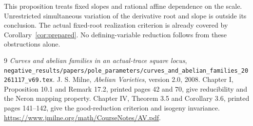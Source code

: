 \documentclass[11pt,a4paper]{article}
\begin{document}
This proposition treats fixed slopes and rational affine dependence
on the scale. Unrestricted simultaneous variation of the derivative
root and slope is outside its conclusion. The actual fixed-root
realization criterion is already covered by
Corollary~\ref{cor:prepared}. No defining-variable reduction follows
from these obstructions alone.

\begin{thebibliography}{9}
\emph{Curves and abelian families in an actual-trace square locus},
\nolinkurl{negative_results/papers/pole_parameters/curves_and_abelian_families_20261117_v69.tex}.
 J. S. Milne, \emph{Abelian Varieties}, version 2.0,
2008. Chapter I, Proposition 10.1 and Remark 17.2, printed
pages 42 and 70, give reducibility and the Neron mapping property.
Chapter IV, Theorem 3.5 and Corollary 3.6, printed
pages 141--142, give the good-reduction criterion and isogeny invariance.
\url{https://www.jmilne.org/math/CourseNotes/AV.pdf}.
\end{thebibliography}
\end{document}
